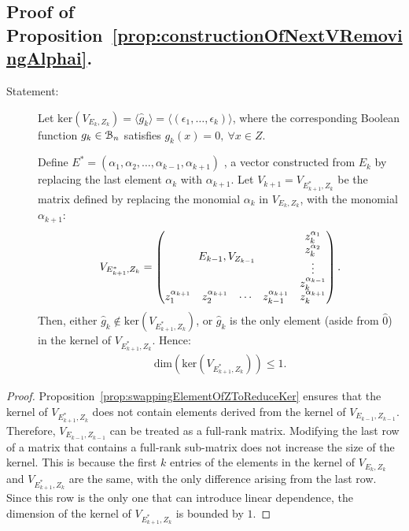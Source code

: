 \documentclass[11pt]{llncs}
\begin{document}
\subsection{Proof of Proposition~\ref{prop:constructionOfNextVRemovingAlphai}.}
\begin{description}
    \item[Statement:] Let $\text{ker}(V_{E_k, Z_k}) =  \langle \hat{g}_k \rangle = \langle (\epsilon_1, \dots, \epsilon_k) \rangle$, where the corresponding Boolean function $g_k\in \mathcal{B}_{n}$ satisfies $g_k(x) = 0,\ \forall x\in Z$.
    
    Define $E^{*} = (\alpha_1, \alpha_2, \dots, \alpha_{k-1}, \alpha_{k+1})$ , a vector constructed from $E_k$ by replacing the last element $\alpha_{k}$ with $\alpha_{k+1}$. 
    Let $V_{k+1} = V_{E^{*}_{k+1}, Z_k}$ be the matrix defined by replacing the monomial $\alpha_k$ in $V_{E_k, Z_k}$, with the monomial $\alpha_{k+1}$: 
    \begin{align*}
        V_{E^{*}_{k+1}, Z_{k}} = 
        \begin{pmatrix}
        \multicolumn{4}{c}{\multirow{4}{*}{$E_{k-1}, V_{Z_{k-1}}$}} & z_{k}^{\alpha_{1}}\\
        & & & & z_{k}^{\alpha_{2}}\\
        & & & & \vdots\\
        & & & & z_{k}^{\alpha_{k-1}}\\
        z_{1}^{\alpha_{k+1}} & z_{2}^{\alpha_{k+1}}& \cdots & z_{k-1}^{\alpha_{k+1}} & z_{k}^{\alpha_{k+1}}
    \end{pmatrix}.
    \end{align*}
    Then, either $\hat{g}_k \not\in \text{ker}(V_{E^{*}_{k+1}, Z_k})$, or $\hat{g}_k$ is the only element (aside from $\hat{0}$) in the kernel of $V_{E_{k+1}^{*}, Z_k}$. Hence:
    \begin{align*}
        \text{dim}\left(\text{ker}(V_{E^{*}_{k+1}, Z_k})\right)\leq 1. 
    \end{align*}
\end{description}

\begin{proof}
    Proposition~\ref{prop:swappingElementOfZToReduceKer} ensures that the kernel of $V_{E^{*}_{k+1}, Z_{k}}$ does not contain elements derived from the kernel of $V_{ E_{k-1}, Z_{k-1}}$. 
    Therefore, $V_{E_{k-1}, Z_{k-1}}$ can be treated as a full-rank matrix.
    Modifying the last row of a matrix that contains a full-rank sub-matrix does not increase the size of the kernel. This is because the first $k$ entries of the elements in the kernel of $V_{E_k, Z_k }$ and $V_{E^{*}_{k+1}, Z_k}$ are the same, with the only difference arising from the last row. 
    Since this row is the only one that can introduce linear dependence, the dimension of the kernel of $V_{ E^{*}_{k+1}, Z_k}$ is bounded by $1$.
\end{proof}
\end{document}
